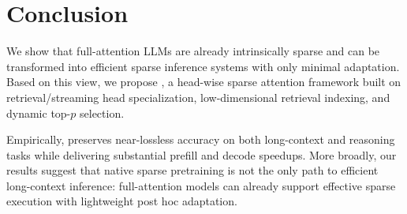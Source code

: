 \section{Conclusion}

We show that full-attention LLMs are already intrinsically sparse and can be transformed into efficient sparse inference systems with only minimal adaptation. Based on this view, we propose \name, a head-wise sparse attention framework built on retrieval/streaming head specialization, low-dimensional retrieval indexing, and dynamic top-$p$ selection.

Empirically, \name preserves near-lossless accuracy on both long-context and reasoning tasks while delivering substantial prefill and decode speedups. More broadly, our results suggest that native sparse pretraining is not the only path to efficient long-context inference: full-attention models can already support effective sparse execution with lightweight post hoc adaptation.
